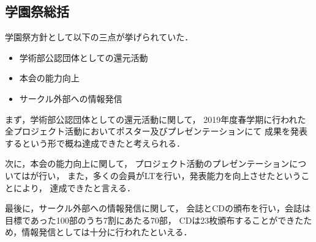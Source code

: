\subsection*{学園祭総括}

学園祭方針として以下の三点が挙げられていた．

\begin{itemize}
    \item 学術部公認団体としての還元活動
    \item 本会の能力向上
    \item サークル外部への情報発信
\end{itemize}

まず，学術部公認団体としての還元活動に関して，
2019年度春学期に行われた全プロジェクト活動においてポスター及びプレゼンテーションにて
成果を発表するという形で概ね達成できたと考えられる．

次に，本会の能力向上に関して，
プロジェクト活動のプレゼンテーションについては\firstGrade{}が行い，
また，多くの会員がLTを行い，発表能力を向上させたということにより，
達成できたと言える．

最後に，サークル外部への情報発信に関して，
会誌とCDの頒布を行い，会誌は目標であった100部のうち7割にあたる70部，
CDは23枚頒布することができたため，情報発信としては十分に行われたといえる．